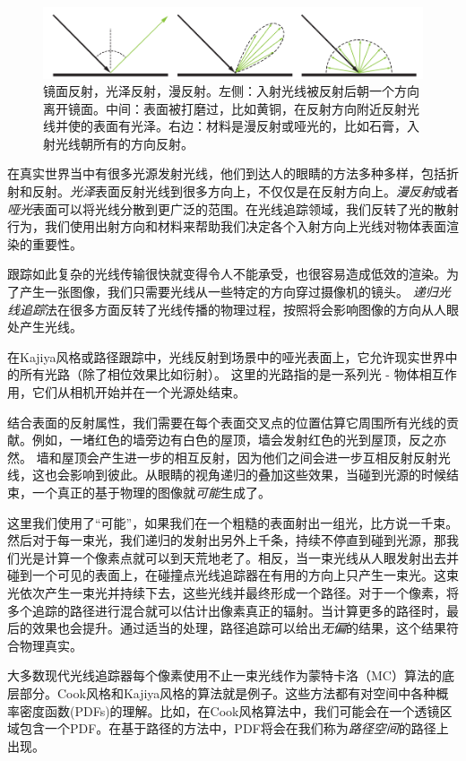 \documentclass[12pt]{article}
\begin{document}
\begin{figure}
	\centering
	\includegraphics[width=12.0cm]{Fig1-4.png}
	\caption{镜面反射，光泽反射，漫反射。左侧：入射光线被反射后朝一个方向离开镜面。中间：表面被打磨过，比如黄铜，在反射方向附近反射光线并使的表面有光泽。右边：材料是漫反射或哑光的，比如石膏，入射光线朝所有的方向反射。}
	\label{Fig1-4}
\end{figure}

在真实世界当中有很多光源发射光线，他们到达人的眼睛的方法多种多样，包括折射和反射。\textit{光泽}表面反射光线到很多方向上，不仅仅是在反射方向上。\textit{漫反射}或者\textit{哑光}表面可以将光线分散到更广泛的范围。在光线追踪领域，我们反转了光的散射行为，我们使用出射方向和材料来帮助我们决定各个入射方向上光线对物体表面渲染的重要性。

跟踪如此复杂的光线传输很快就变得令人不能承受，也很容易造成低效的渲染。为了产生一张图像，我们只需要光线从一些特定的方向穿过摄像机的镜头。 \textit{递归光线追踪}法在很多方面反转了光线传播的物理过程，按照将会影响图像的方向从人眼处产生光线。

在Kajiya风格或路径跟踪中，光线反射到场景中的哑光表面上，它允许现实世界中的所有光路（除了相位效果比如衍射）。 这里的光路指的是一系列光 - 物体相互作用，它们从相机开始并在一个光源处结束。

结合表面的反射属性，我们需要在每个表面交叉点的位置估算它周围所有光线的贡献。例如，一堵红色的墙旁边有白色的屋顶，墙会发射红色的光到屋顶，反之亦然。 墙和屋顶会产生进一步的相互反射，因为他们之间会进一步互相反射反射光线，这也会影响到彼此。从眼睛的视角递归的叠加这些效果，当碰到光源的时候结束，一个真正的基于物理的图像就\textit{可能}生成了。

这里我们使用了“可能”，如果我们在一个粗糙的表面射出一组光，比方说一千束。然后对于每一束光，我们递归的发射出另外上千条，持续不停直到碰到光源，那我们光是计算一个像素点就可以到天荒地老了。相反，当一束光线从人眼发射出去并碰到一个可见的表面上，在碰撞点光线追踪器在有用的方向上只产生一束光。这束光依次产生一束光并持续下去，这些光线并最终形成一个路径。对于一个像素，将多个追踪的路径进行混合就可以估计出像素真正的辐射。当计算更多的路径时，最后的效果也会提升。通过适当的处理，路径追踪可以给出\textit{无偏}的结果，这个结果符合物理真实。

大多数现代光线追踪器每个像素使用不止一束光线作为蒙特卡洛（MC）算法的底层部分。Cook风格和Kajiya风格的算法就是例子。这些方法都有对空间中各种概率密度函数(PDFs)的理解。比如，在Cook风格算法中，我们可能会在一个透镜区域包含一个PDF。在基于路径的方法中，PDF将会在我们称为\textit{路径空间}的路径上出现。
\end{document}
